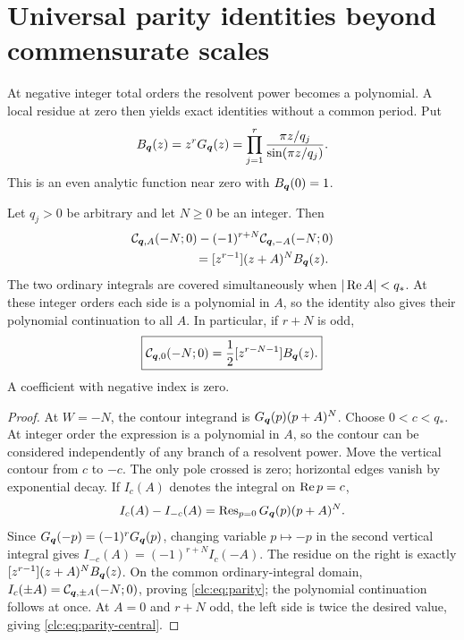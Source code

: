 \section{Universal parity identities beyond commensurate scales}
\label{clc:sec:parity}

At negative integer total orders the resolvent power becomes a
polynomial. A local residue at zero then yields exact identities
without a common period. Put
\begin{equation}\label{clc:eq:Bq}
 B_{\boldsymbol q}(z)=z^rG_{\boldsymbol q}(z)
       =\prod_{j=1}^r\frac{\pi z/q_j}{\sin(\pi z/q_j)}.
\end{equation}
This is an even analytic function near zero with $B_{\boldsymbol q}(0)=1$.

\begin{theorem}
\label{clc:thm:parity}
Let $q_j>0$ be arbitrary and let $N\ge0$ be an integer. Then
\begin{align}
 &\CC_{\bq,A}(-N;0)-(-1)^{r+N}\CC_{\bq,-A}(-N;0)\notag\\
 &\hspace{18mm}=[z^{r-1}](z+A)^N B_{\bq}(z).
 \label{clc:eq:parity}
\end{align}
The two ordinary integrals are covered simultaneously when
$|\operatorname{Re} A|<q_*$. At these integer orders each side is a polynomial in
$A$, so the identity also gives their polynomial continuation to all $A$.
In particular, if $r+N$ is odd,
\begin{equation}\label{clc:eq:parity-central}
 \boxed{\displaystyle
 \mathcal C_{\boldsymbol q,0}(-N;0)=\frac12[z^{r-N-1}]B_{\boldsymbol q}(z).}
\end{equation}
A coefficient with negative index is zero.
\end{theorem}
\begin{proof}
At $W=-N$, the contour integrand is
$G_{\boldsymbol q}(p)(p+A)^N$. Choose $0<c<q_*$. At integer order the expression
is a polynomial in $A$, so the contour can be considered independently
of any branch of a resolvent power. Move the vertical contour from $c$
to $-c$. The only pole crossed is zero; horizontal edges vanish by
exponential decay. If $I_c(A)$ denotes the integral on $\operatorname{Re} p=c$,
\[
 I_c(A)-I_{-c}(A)=\operatorname{Res}_{p=0}G_{\boldsymbol q}(p)(p+A)^N.
\]
Since $G_{\boldsymbol q}(-p)=(-1)^rG_{\boldsymbol q}(p)$, changing variable $p\mapsto-p$
in the second vertical integral gives
$I_{-c}(A)=(-1)^{r+N}I_c(-A)$.
The residue on the right is exactly
$[z^{r-1}](z+A)^NB_{\boldsymbol q}(z)$. On the common ordinary-integral domain,
$I_c(\pm A)=\mathcal C_{\boldsymbol q,\pm A}(-N;0)$, proving
\eqref{clc:eq:parity}; the polynomial continuation follows at once.
At $A=0$ and $r+N$ odd, the left side is twice the desired value,
giving \eqref{clc:eq:parity-central}.
\end{proof}


